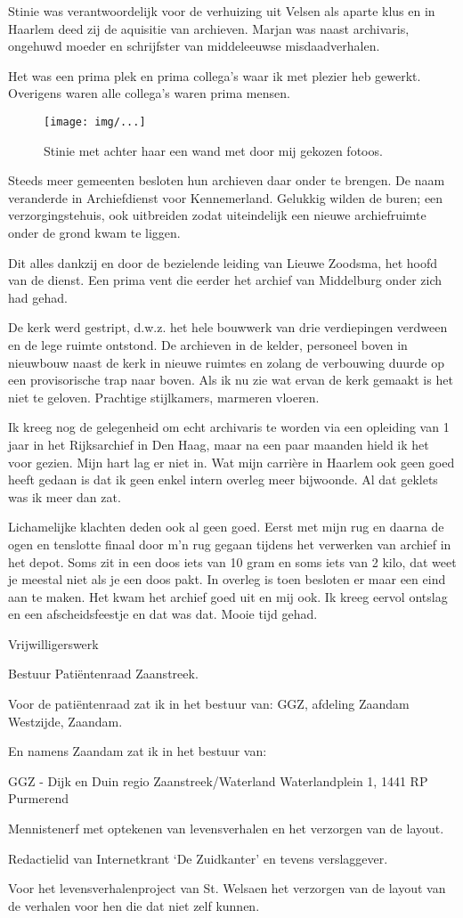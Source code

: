 \documentclass[10pt,twoside,openright]{memoir}
\begin{document}
Stinie was verantwoordelijk voor de verhuizing uit Velsen als aparte klus en in Haarlem deed zij de aquisitie van archieven. Marjan was naast archivaris, ongehuwd moeder en schrijfster van middeleeuwse misdaadverhalen.

Het was een prima plek en prima collega’s waar ik met plezier heb gewerkt. Overigens waren alle collega’s waren prima mensen. 

\begin{figure}[t]
\texttt{[image: img/...]}
\caption{Stinie met achter haar een wand met door mij gekozen fotoos.}
\end{figure}

Steeds meer gemeenten besloten hun archieven daar onder te brengen. De naam veranderde in Archiefdienst voor Kennemerland. Gelukkig wilden de buren; een verzorgingstehuis, ook uitbreiden zodat uiteindelijk een nieuwe archiefruimte onder de grond kwam te liggen. 

Dit alles dankzij en door de bezielende leiding van Lieuwe Zoodsma, het hoofd van de dienst. Een prima vent die eerder het archief van Middelburg onder zich had gehad.

De kerk werd gestript, d.w.z. het hele bouwwerk van drie verdiepingen verdween en de lege ruimte ontstond. De archieven in de kelder, personeel boven in nieuwbouw naast de kerk in nieuwe ruimtes en zolang de verbouwing duurde op een provisorische trap naar boven. Als ik nu zie wat ervan de kerk gemaakt is het niet te geloven. Prachtige stijlkamers, marmeren vloeren.

Ik kreeg nog de gelegenheid om echt archivaris te worden via een opleiding van 1 jaar in het Rijksarchief in Den Haag, maar na een paar maanden hield ik het voor gezien. Mijn hart lag er niet in. Wat mijn carrière in Haarlem ook geen goed heeft gedaan is dat ik geen enkel intern overleg meer bijwoonde. Al dat geklets was ik meer dan zat. 

Lichamelijke klachten deden ook al geen goed. Eerst met mijn rug en daarna de ogen en tenslotte finaal door m’n rug gegaan tijdens het verwerken van archief in het depot. Soms zit in een doos iets van 10 gram en soms iets van 2 kilo, dat weet je meestal niet als je een doos pakt. In overleg is toen besloten er maar een eind aan te maken. Het kwam het archief goed uit en mij ook. Ik kreeg eervol ontslag en een afscheidsfeestje en dat was dat. Mooie tijd gehad.

Vrijwilligerswerk

Bestuur Patiëntenraad Zaanstreek. 

Voor de patiëntenraad zat ik in het bestuur van:
GGZ, afdeling Zaandam Westzijde, Zaandam.

En namens Zaandam zat ik in het bestuur van:

GGZ - Dijk en Duin regio Zaanstreek/Waterland Waterlandplein 1, 1441 RP Purmerend

Mennistenerf met optekenen van levensverhalen en het verzorgen van de layout.

Redactielid van Internetkrant ‘De Zuidkanter’ en tevens verslaggever.

Voor het levensverhalenproject van St. Welsaen het verzorgen van de layout van de verhalen voor hen die dat niet zelf kunnen.
\end{document}
